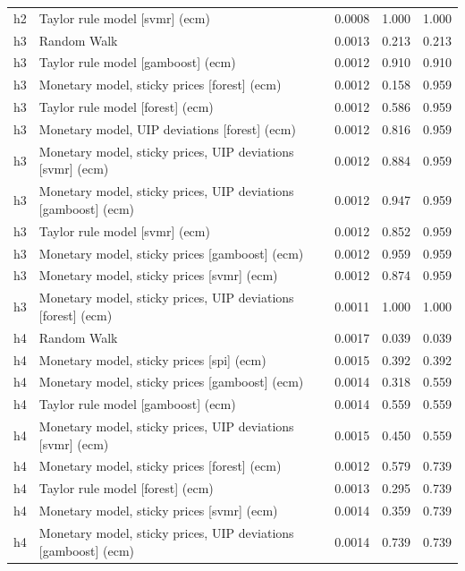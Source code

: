 \begin{ThreePartTable}
\begin{longtable}[t]{cp{5.5cm}ccc}
h2 & \raggedright Taylor rule model [svmr] (ecm) & 0.0008 & 1.000 & 1.000\\
\addlinespace
h3 & \raggedright Random Walk & 0.0013 & 0.213 & 0.213\\
h3 & \raggedright Taylor rule model [gamboost] (ecm) & 0.0012 & 0.910 & 0.910\\
h3 & \raggedright Monetary model, sticky prices [forest] (ecm) & 0.0012 & 0.158 & 0.959\\
h3 & \raggedright Taylor rule model [forest] (ecm) & 0.0012 & 0.586 & 0.959\\
h3 & \raggedright Monetary model, UIP deviations [forest] (ecm) & 0.0012 & 0.816 & 0.959\\
h3 & \raggedright Monetary model, sticky prices, UIP deviations [svmr] (ecm) & 0.0012 & 0.884 & 0.959\\
h3 & \raggedright Monetary model, sticky prices, UIP deviations [gamboost] (ecm) & 0.0012 & 0.947 & 0.959\\
h3 & \raggedright Taylor rule model [svmr] (ecm) & 0.0012 & 0.852 & 0.959\\
h3 & \raggedright Monetary model, sticky prices [gamboost] (ecm) & 0.0012 & 0.959 & 0.959\\
h3 & \raggedright Monetary model, sticky prices [svmr] (ecm) & 0.0012 & 0.874 & 0.959\\
h3 & \raggedright Monetary model, sticky prices, UIP deviations [forest] (ecm) & 0.0011 & 1.000 & 1.000\\
\addlinespace
h4 & \raggedright Random Walk & 0.0017 & 0.039 & 0.039\\
h4 & \raggedright Monetary model, sticky prices [spi] (ecm) & 0.0015 & 0.392 & 0.392\\
h4 & \raggedright Monetary model, sticky prices [gamboost] (ecm) & 0.0014 & 0.318 & 0.559\\
h4 & \raggedright Taylor rule model [gamboost] (ecm) & 0.0014 & 0.559 & 0.559\\
h4 & \raggedright Monetary model, sticky prices, UIP deviations [svmr] (ecm) & 0.0015 & 0.450 & 0.559\\
h4 & \raggedright Monetary model, sticky prices [forest] (ecm) & 0.0012 & 0.579 & 0.739\\
h4 & \raggedright Taylor rule model [forest] (ecm) & 0.0013 & 0.295 & 0.739\\
h4 & \raggedright Monetary model, sticky prices [svmr] (ecm) & 0.0014 & 0.359 & 0.739\\
h4 & \raggedright Monetary model, sticky prices, UIP deviations [gamboost] (ecm) & 0.0014 & 0.739 & 0.739\\

\end{longtable}
\end{ThreePartTable}

